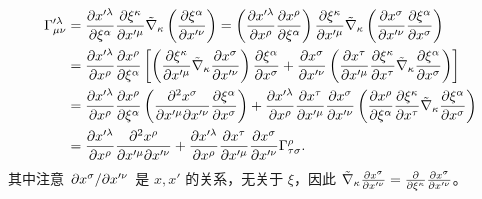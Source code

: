 \begin{align*}
\Gamma_{\mu \nu}^{\prime \lambda} &= \pdv{x^{\prime \lambda}}{\xi^\alpha} \pdv{\xi^\kappa}{x^{\prime \mu}} \tilde{\nabla}_\kappa \left(\pdv{\xi^\alpha}{x^{\prime \nu}}\right) = \left(\pdv{x^{\prime \lambda}}{x^\rho} \pdv{x^\rho}{\xi^\alpha}\right) \pdv{\xi^\kappa}{x^{\prime \mu}} \tilde{\nabla}_\kappa \left(\pdv{x^\sigma}{x^{\prime \nu}} \pdv{\xi^\alpha}{x^\sigma}\right) \\
&= \pdv{x^{\prime \lambda}}{x^\rho} \pdv{x^\rho}{\xi^\alpha} \left[ \left(\pdv{\xi^\kappa}{x^{\prime \mu}} \tilde{\nabla}_\kappa \pdv{x^\sigma}{x^{\prime \nu}}\right) \pdv{\xi^\alpha}{x^\sigma} + \pdv{x^\sigma}{x^{\prime \nu}} \left(\pdv{x^\tau}{x^{\prime \mu}} \pdv{\xi^\kappa}{x^\tau} \tilde{\nabla}_\kappa \pdv{\xi^\alpha}{x^\sigma}\right) \right] \\
&= \pdv{x^{\prime \lambda}}{x^\rho} \pdv{x^\rho}{\xi^\alpha} \left( \pdv{x^\sigma}{x^{\prime \mu}}{x^{\prime \nu}} \pdv{\xi^\alpha}{x^\sigma} \right) + \pdv{x^{\prime \lambda}}{x^\rho} \pdv{x^\tau}{x^{\prime \mu}} \pdv{x^\sigma}{x^{\prime \nu}} \left( \pdv{x^\rho}{\xi^\alpha} \pdv{\xi^\kappa}{x^\tau} \tilde{\nabla}_\kappa \pdv{\xi^\alpha}{x^\sigma} \right) \\
&= \pdv{x^{\prime \lambda}}{x^\rho} \pdv{x^\rho}{x^{\prime \mu}}{x^{\prime \nu}} + \pdv{x^{\prime \lambda}}{x^\rho} \pdv{x^\tau}{x^{\prime \mu}} \pdv{x^\sigma}{x^{\prime \nu}} \Gamma_{\tau \sigma}^\rho.
\end{align*}
其中注意 $\pdv*{x^\sigma}{x^{\prime \nu}}$ 是 $x,x'$ 的关系，无关于 $\xi$，因此
$\tilde{\nabla}_\kappa \pdv{x^\sigma}{x^{\prime \nu}} = \pdv{\xi^\kappa}\pdv{x^\sigma}{x^{\prime \nu}}$。


